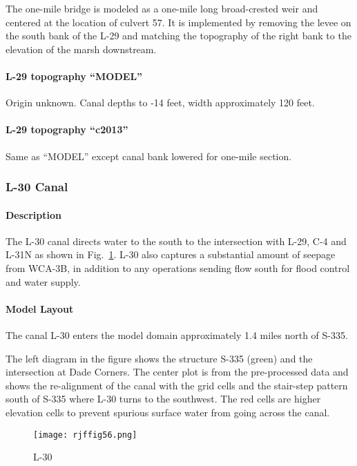 The one-mile bridge is modeled as a one-mile long broad-crested weir and centered at the location of culvert 57. It is implemented by removing the levee on the south bank of the L-29 and matching the topography of the right bank to the elevation of the marsh downstream.

\paragraph{L-29 topography ``MODEL''}
Origin unknown. Canal depths to -14 feet, width approximately 120 feet.

\paragraph{L-29 topography ``c2013''}
Same as ``MODEL'' except canal bank lowered for one-mile section.


\clearpage

\subsubsection{L-30 Canal}
\paragraph{Description}

The L-30 canal directs water to the south to the intersection with L-29, C-4 and L-31N as shown in Fig.~\ref{fig:rjffig56}. L-30 also captures a substantial amount of seepage from WCA-3B, in addition to any operations sending flow south for flood control and water supply.

\paragraph{Model Layout}
The canal L-30 enters the model domain approximately 1.4 miles north of S-335.

The left diagram in the figure shows the structure S-335 (green) and the intersection at Dade Corners. The center plot is from the pre-processed data and shows the re-alignment of the canal with the grid cells and the stair-step pattern south of S-335 where L-30 turns to the southwest. The red cells are higher elevation cells to prevent spurious surface water from going across the canal.

\begin{figure}[!h]
  \begin{center}
  \texttt{[image: rjffig56.png]}
  \caption{L-30}
  \label{fig:rjffig56}
  \end{center}
\end{figure}


